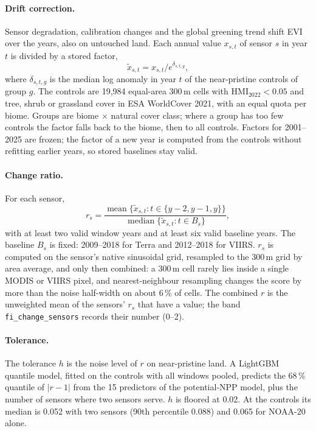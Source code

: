 \documentclass[11pt,a4paper]{article}
\newcommand{\HMI}{\mathrm{HMI}}
\begin{document}
\paragraph{Drift correction.} Sensor degradation, calibration changes and the global greening
trend shift EVI over the years, also on untouched land. Each annual value $x_{s,t}$ of sensor $s$
in year $t$ is divided by a stored factor,
\begin{equation}
\tilde x_{s,t} = x_{s,t} / e^{\delta_{s,t,g}},
\end{equation}
where $\delta_{s,t,g}$ is the median log anomaly in year $t$ of the near-pristine controls of group
$g$. The controls are 19,984 equal-area 300\,m cells with $\HMI_{2022} < 0.05$ and tree, shrub or
grassland cover in ESA WorldCover 2021, with an equal quota per biome. Groups are biome $\times$
natural cover class; where a group has too few controls the factor falls back to the biome, then to
all controls. Factors for 2001--2025 are frozen; the factor of a new year is computed from the
controls without refitting earlier years, so stored baselines stay valid.

\paragraph{Change ratio.} For each sensor,
\begin{equation}
r_s = \frac{\operatorname{mean}\{\tilde x_{s,t} : t \in \{y-2, y-1, y\}\}}
{\operatorname{median}\{\tilde x_{s,t} : t \in B_s\}},
\end{equation}
with at least two valid window years and at least six valid baseline years. The baseline $B_s$ is
fixed: 2009--2018 for Terra and 2012--2018 for VIIRS. $r_s$ is computed on the sensor's native
sinusoidal grid, resampled to the 300\,m grid by area average, and only then combined: a 300\,m
cell rarely lies inside a single MODIS or VIIRS pixel, and nearest-neighbour resampling changes
the score by more than the noise half-width on about 6\,\% of cells. The combined $r$ is the
unweighted mean of the sensors' $r_s$ that have a value; the band \texttt{fi\_change\_sensors}
records their number (0--2).

\paragraph{Tolerance.} The tolerance $h$ is the noise level of $r$ on near-pristine land. A
LightGBM quantile model, fitted on the controls with all windows pooled, predicts the 68\,\%
quantile of $|r - 1|$ from the 15 predictors of the potential-NPP model, plus the number of
sensors where two sensors serve. $h$ is floored at 0.02. At the controls its median is 0.052 with
two sensors (90th percentile 0.088) and 0.065 for NOAA-20 alone.
\end{document}
